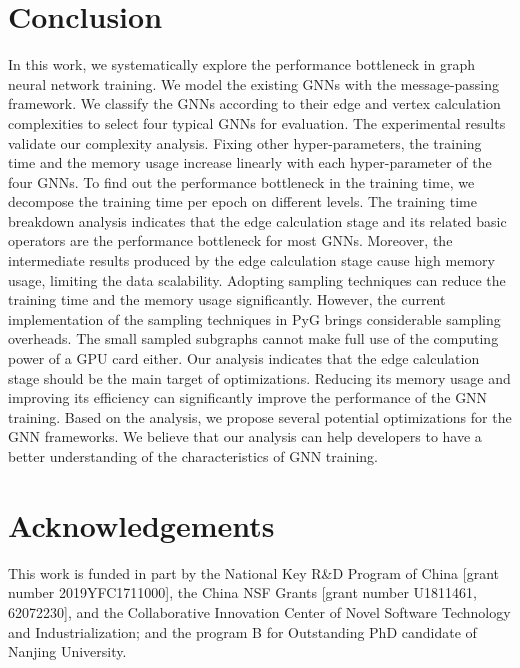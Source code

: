 \section{Conclusion}
\label{sec:conclusion}

In this work, we systematically explore the performance bottleneck in graph neural network training. 
We model the existing GNNs with the message-passing framework. 
We classify the GNNs according to their edge and vertex calculation complexities to select four typical GNNs for evaluation. 
The experimental results validate our complexity analysis. Fixing other hyper-parameters, the training time and the memory usage increase linearly with each hyper-parameter of the four GNNs. 
To find out the performance bottleneck in the training time, we decompose the training time per epoch on different levels. 
The training time breakdown analysis indicates that the edge calculation stage and its related basic operators are the performance bottleneck for most GNNs. 
Moreover, the intermediate results produced by the edge calculation stage cause high memory usage, limiting the data scalability. 
Adopting sampling techniques can reduce the training time and the memory usage significantly. 
However, the current implementation of the sampling techniques in PyG brings considerable sampling overheads. 
The small sampled subgraphs cannot make full use of the computing power of a GPU card either. 
Our analysis indicates that the edge calculation stage should be the main target of optimizations. 
Reducing its memory usage and improving its efficiency can significantly improve the performance of the GNN training. 
Based on the analysis, we propose several potential optimizations for the GNN frameworks. 
We believe that our analysis can help developers to have a better understanding of the characteristics of GNN training.

\section*{Acknowledgements}

This work is funded in part by the National Key R\&D Program of China [grant number 2019YFC1711000], the China NSF Grants [grant number U1811461, 62072230], and the Collaborative Innovation Center of Novel Software Technology and Industrialization; and the program B for Outstanding PhD candidate of Nanjing University.
